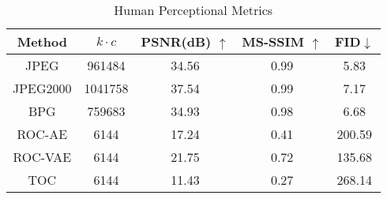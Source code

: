 

\begin{table}
\centering
\footnotesize
\caption{Human Perceptional Metrics}
\label{tab_result_metrics}
\begin{tabular}{ccccc} 
\toprule
Method   & $k\cdot c$ & PSNR(dB) $\uparrow$ & MS-SSIM $\uparrow$ & FID$\downarrow$  \\ 
\midrule
JPEG     & 961484           & 34.56               & 0.99               & 5.83             \\
JPEG2000 & 1041758          & 37.54               & 0.99               & 7.17             \\
BPG      & 759683           & 34.93               & 0.98               & 6.68             \\
ROC-AE   & 6144             & 17.24               & 0.41               & 200.59           \\
ROC-VAE  & 6144             & 21.75               & 0.72               & 135.68           \\
TOC      & 6144             & 11.43               & 0.27               & 268.14           \\
\bottomrule
\end{tabular}
\end{table}